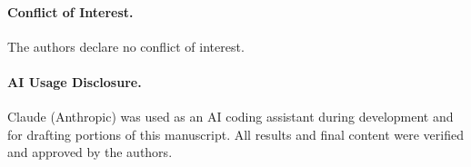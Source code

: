 \paragraph{Conflict of Interest.}
The authors declare no conflict of interest.

\paragraph{AI Usage Disclosure.}
Claude (Anthropic) was used as an AI coding assistant during
development and for drafting portions of this manuscript. All results
and final content were verified and approved by the authors.
